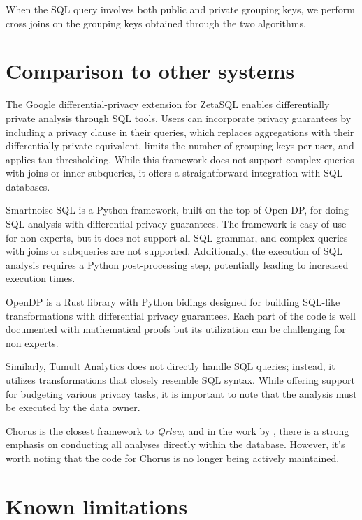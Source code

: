 \documentclass[letterpaper]{article} %
\newcommand{\qrlew}{\emph{Qrlew}}
\begin{document}
When the SQL query involves both public and private grouping keys, we perform cross joins on the grouping keys obtained through the two algorithms.

\section{Comparison to other systems}

The Google differential-privacy extension for ZetaSQL enables differentially private analysis through SQL tools.
Users can incorporate privacy guarantees by including a privacy clause in their queries, which replaces aggregations with their differentially private equivalent,
limits the number of grouping keys per user, and applies tau-thresholding.
While this framework does not support complex queries with joins or inner subqueries,
it offers a straightforward integration with SQL databases.

Smartnoise SQL is a Python framework, built on the top of Open-DP, for doing SQL analysis with differential privacy guarantees.
The framework is easy of use for non-experts, but it does not support all SQL grammar, and complex queries with joins or subqueries are not supported.
Additionally, the execution of SQL analysis requires a Python post-processing step,
potentially leading to increased execution times.

OpenDP is a Rust library with Python bidings designed for building SQL-like transformations with differential privacy guarantees.
Each part of the code is well documented with mathematical proofs but
its utilization can be challenging for non experts.

Similarly, Tumult Analytics does not directly handle SQL queries; instead, it utilizes transformations that closely resemble SQL syntax.
While offering support for budgeting various privacy tasks, it is important to note that the analysis must be executed by the data owner.

Chorus is the closest framework to \qrlew, and in the work by \citeauthor{johnson2020chorus},
there is a strong emphasis on conducting all analyses directly within the database.
However, it's worth noting that the code for Chorus is no longer being actively maintained.



\section{Known limitations}
\end{document}
